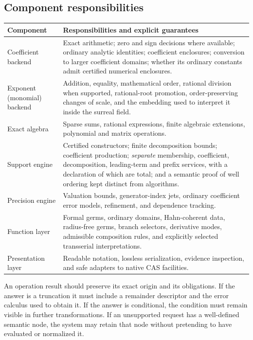 \documentclass[11pt,letterpaper]{article}
\numberwithin{equation}{section}
\theoremstyle{definition}
\theoremstyle{remark}
\begin{document}
\subsection{Component responsibilities}
\label{cas:sub-components}
\begingroup\small
\begin{longtable}{@{}P{0.24\textwidth}P{0.70\textwidth}@{}}
\toprule
Component & Responsibilities and explicit guarantees\\
\midrule\endhead
Coefficient backend & Exact arithmetic; zero and sign decisions where available;
ordinary analytic identities; coefficient enclosures; conversion to larger
coefficient domains; whether its ordinary constants admit certified numerical
enclosures.\\[0.4em]
Exponent (monomial) backend & Addition, equality, mathematical order, rational
division when supported, rational-root promotion, order-preserving changes of
scale, and the embedding used to interpret it inside the surreal field.\\[0.4em]
Exact algebra & Sparse sums, rational expressions, finite algebraic extensions,
polynomial and matrix operations.\\[0.4em]
Support engine & Certified constructors; finite decomposition bounds;
coefficient production; \emph{separate} membership, coefficient, decomposition,
leading-term and prefix services, with a declaration of which are total; and a
semantic proof of well ordering kept distinct from algorithms.\\[0.4em]
Precision engine & Valuation bounds, generator-index jets, ordinary coefficient
error models, refinement, and dependence tracking.\\[0.4em]
Function layer & Formal germs, ordinary domains, Hahn-coherent data, radius-free
germs, branch selectors, derivative modes, admissible composition rules, and
explicitly selected transserial interpretations.\\[0.4em]
Presentation layer & Readable notation, lossless serialization, evidence
inspection, and safe adapters to native CAS facilities.\\
\bottomrule
\end{longtable}
\endgroup

An operation result should preserve its exact origin and its obligations. If the
answer is a truncation it must include a remainder descriptor and the error
calculus used to obtain it. If the answer is conditional, the condition must
remain visible in further transformations. If an unsupported request has a
well-defined semantic node, the system may retain that node without pretending
to have evaluated or normalized it.
\end{document}
